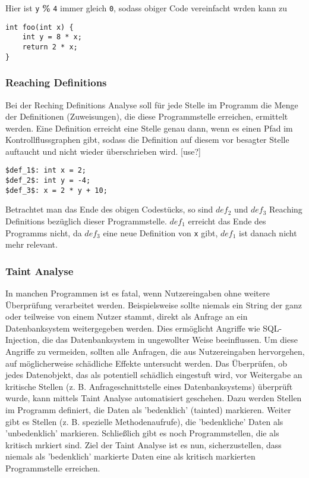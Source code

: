 Hier ist \lstinline|y| \textbf{\%} \lstinline|4| immer gleich \lstinline{0}, sodass obiger Code vereinfacht wrden kann zu
\begin{lstlisting}[frame=single]
int foo(int x) {
	int y = 8 * x;
	return 2 * x;
} 
\end{lstlisting}

\subsubsection{Reaching Definitions}
Bei der Reching Definitions Analyse soll für jede Stelle im Programm die Menge der Definitionen (Zuweisungen), die diese Programmstelle erreichen, ermittelt werden.
Eine Definition erreicht eine Stelle genau dann, wenn es einen Pfad im Kontrollflussgraphen gibt, sodass die Definition auf diesem vor besagter Stelle auftaucht und nicht wieder überschrieben wird.
[use?]
\begin{lstlisting}[frame=single]
$def_1$: int x = 2;
$def_2$: int y = -4;
$def_3$: x = 2 * y + 10; 
\end{lstlisting}
Betrachtet man das Ende des obigen Codestücks, so sind $def_2$ und $def_3$ Reaching Definitions bezüglich dieser Programmstelle.
$def_1$ erreicht das Ende des Programms nicht, da $def_3$ eine neue Definition von \lstinline{x} gibt, $def_1$ ist danach nicht mehr relevant.

\subsubsection{Taint Analyse}
In manchen Programmen ist es fatal, wenn Nutzereingaben ohne weitere Überprüfung verarbeitet werden. 
Beispielsweise sollte niemals ein String der ganz oder teilweise von einem Nutzer stammt, direkt als Anfrage an ein Datenbanksystem weitergegeben werden.
Dies ermöglicht Angriffe wie SQL-Injection, die das Datenbanksystem in ungewollter Weise beeinflussen.
Um diese Angriffe zu vermeiden, sollten alle Anfragen, die aus Nutzereingaben hervorgehen, auf möglicherweise schädliche Effekte untersucht werden.
Das Überprüfen, ob jedes Datenobjekt, das als potentiell schädlich eingestuft wird, vor Weitergabe an kritische Stellen (z. B. Anfrageschnittstelle eines Datenbanksystems) überprüft wurde, kann mittels Taint Analyse automatisiert geschehen.
Dazu werden Stellen im Programm definiert, die Daten als 'bedenklich' (tainted) markieren.
Weiter gibt es Stellen (z. B. spezielle Methodenaufrufe), die 'bedenkliche' Daten als 'unbedenklich' markieren.
Schließlich gibt es noch Programmstellen, die als kritisch mrkiert sind.
Ziel der Taint Analyse ist es nun, sicherzustellen, dass niemals als 'bedenklich' markierte Daten eine als kritisch markierten Programmstelle erreichen.


